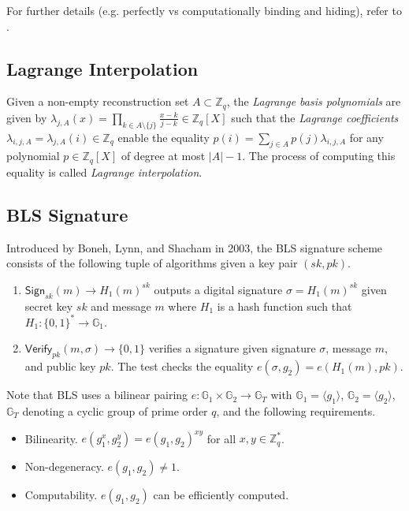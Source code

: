 \documentclass[letterpaper,twocolumn,10pt]{article}
\theoremstyle{definition}
\theoremstyle{remark}
\begin{document}
\iffalse
    Obviously, such secure box needs to be secure, satisfying the following two properties.
    \begin{itemize}
    \item \textit{Binding property} requires that it is not possible for $P$ to change $m$ after $\mathsf{Com}(m, r_0)$ is given to $V$.
    \item \textit{Hiding property} requires that it is not possible for $V$ to learn $m$ before $\mathsf{Open}(m, r_0)$ is given to $V$ by $P$.
    \end{itemize}
\fi
For further details (e.g. perfectly vs computationally binding and hiding), refer to \cite{damgaard1998commitment}.
\fi

\subsection{Lagrange Interpolation}
\label{appendix:lagrange}
Given a non-empty reconstruction set $A \subset \mathbb{Z}_q$, the \textit{Lagrange basis polynomials} are given by $\lambda_{j, A}(x) = \prod_{k \in A \setminus \{j\}} \frac{x - k}{j - k} \in \mathbb{Z}_q[X]$ such that the \textit{Lagrange coefficients} $\lambda_{i, j, A} = \lambda_{j, A}(i) \in \mathbb{Z}_q$ enable the equality $p(i) = \sum_{j \in A} p(j) \lambda_{i, j, A}$ for any polynomial $p \in \mathbb{Z}_q[X]$ of degree at most $|A| - 1$. The process of computing this equality is called \textit{Lagrange interpolation}.

\subsection{BLS Signature}
\label{appendix:bls}
Introduced by Boneh, Lynn, and Shacham in 2003, the BLS signature scheme \cite{boneh2001short} consists of the following tuple of algorithms given a key pair $(sk, pk)$.
\begin{enumerate}
\item $\mathsf{Sign}_{sk}(m) \rightarrow H_1(m)^{sk}$ outputs a digital signature $\sigma = H_1(m)^{sk}$ given secret key $sk$ and message $m$ where $H_1$ is a hash function such that $H_1: \{0, 1\}^* \rightarrow \mathbb{G}_1$.
\item $\mathsf{Verify}_{pk}(m, \sigma) \rightarrow \{0, 1\}$ verifies a signature given signature $\sigma$, message $m$, and public key $pk$. The test checks the equality $e(\sigma, g_2) = e(H_1(m), pk)$.
\end{enumerate}
Note that BLS uses a bilinear pairing $e: \mathbb{G}_1 \times \mathbb{G}_2 \rightarrow \mathbb{G}_T$ with $\mathbb{G}_1 = \langle g_1 \rangle$, $\mathbb{G}_2 = \langle g_2 \rangle$, $\mathbb{G}_T$ denoting a cyclic group of prime order $q$, and the following requirements.
\begin{itemize}
\item Bilinearity. $e(g_1^x, g_2^y) = e(g_1, g_2)^{x y}$ for all $x, y \in \mathbb{Z}^*_q$.
\item Non-degeneracy. $e(g_1, g_2) \neq 1$.
\item Computability. $e(g_1, g_2)$ can be efficiently computed.
\end{itemize}
\end{document}

